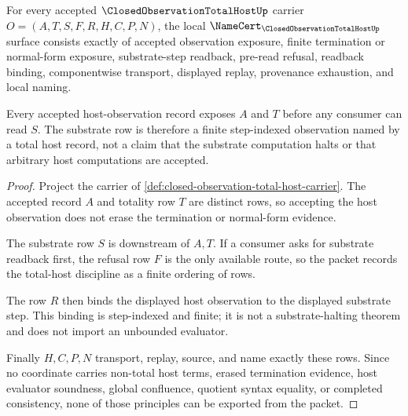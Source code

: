\begin{theorem}
\label{thm:closed-observation-total-host-namecert-obligations}
For every accepted $\ClosedObservationTotalHostUp$ carrier $O=(A,T,S,F,R,H,C,P,N)$, the local $\NameCert_{\ClosedObservationTotalHostUp}$ surface consists exactly of accepted observation exposure, finite termination or normal-form exposure, substrate-step readback, pre-read refusal, readback binding, componentwise transport, displayed replay, provenance exhaustion, and local naming.

Every accepted host-observation record exposes $A$ and $T$ before any consumer can read $S$. The substrate row is therefore a finite step-indexed observation named by a total host record, not a claim that the substrate computation halts or that arbitrary host computations are accepted.
\end{theorem}
\begin{proof}
Project the carrier of \autoref{def:closed-observation-total-host-carrier}. The accepted record $A$ and totality row $T$ are distinct rows, so accepting the host observation does not erase the termination or normal-form evidence.

The substrate row $S$ is downstream of $A,T$. If a consumer asks for substrate readback first, the refusal row $F$ is the only available route, so the packet records the total-host discipline as a finite ordering of rows.

The row $R$ then binds the displayed host observation to the displayed substrate step. This binding is step-indexed and finite; it is not a substrate-halting theorem and does not import an unbounded evaluator.

Finally $H,C,P,N$ transport, replay, source, and name exactly these rows. Since no coordinate carries non-total host terms, erased termination evidence, host evaluator soundness, global confluence, quotient syntax equality, or completed consistency, none of those principles can be exported from the packet.
\end{proof}



